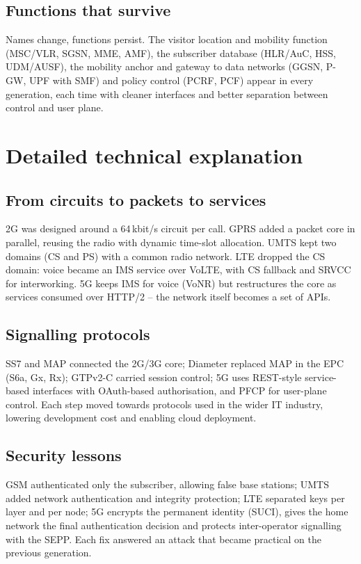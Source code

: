 \documentclass[11pt,a4paper]{article}
\begin{document}
\subsection{Functions that survive}
Names change, functions persist. The visitor location and mobility function (MSC/VLR, SGSN, MME, AMF), the subscriber database (HLR/AuC, HSS,
UDM/AUSF), the mobility anchor and gateway to data networks (GGSN, P-GW, UPF with SMF) and policy control (PCRF, PCF) appear in every
generation, each time with cleaner interfaces and better separation between control and user plane.

\section{Detailed technical explanation}

\subsection{From circuits to packets to services}
2G was designed around a 64\,kbit/s circuit per call. GPRS added a packet core in parallel, reusing the radio with dynamic time-slot
allocation. UMTS kept two domains (CS and PS) with a common radio network. LTE dropped the CS domain: voice became an IMS service over VoLTE,
with CS fallback and SRVCC for interworking. 5G keeps IMS for voice (VoNR) but restructures the core as services consumed over HTTP/2 -- the
network itself becomes a set of APIs.

\subsection{Signalling protocols}
SS7 and MAP connected the 2G/3G core; Diameter replaced MAP in the EPC (S6a, Gx, Rx); GTPv2-C carried session control; 5G uses REST-style
service-based interfaces with OAuth-based authorisation, and PFCP for user-plane control. Each step moved towards protocols used in the wider IT
industry, lowering development cost and enabling cloud deployment.

\subsection{Security lessons}
GSM authenticated only the subscriber, allowing false base stations; UMTS added network authentication and integrity protection; LTE separated
keys per layer and per node; 5G encrypts the permanent identity (SUCI), gives the home network the final authentication decision and protects
inter-operator signalling with the SEPP. Each fix answered an attack that became practical on the previous generation.
\end{document}
